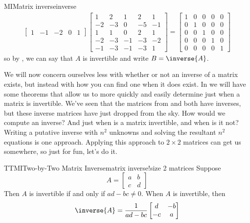 \begin{example}{MI}{Matrix inverse}{inverse}
\begin{align*}
\begin{bmatrix}
 1 & -1 & -2 & 0 & 1
\end{bmatrix}
\begin{bmatrix}
 1 & 2 & 1 & 2 & 1 \\
 -2 & -3 & 0 & -5 & -1 \\
 1 & 1 & 0 & 2 & 1 \\
 -2 & -3 & -1 & -3 & -2 \\
 -1 & -3 & -1 & -3 & 1
\end{bmatrix}
=
\begin{bmatrix}
1 & 0 & 0 & 0 & 0\\
0 & 1 & 0 & 0 & 0\\
0 & 0 & 1 & 0 & 0\\
0 & 0 & 0 & 1 & 0\\
0 & 0 & 0 & 0 & 1
\end{bmatrix}
\end{align*}
%
so by , we can say that $A$ is invertible and write $B=\inverse{A}$.
%
\end{example}
%
We will now concern ourselves less with whether or not an inverse of a matrix exists, but instead with how you can find one when it does exist.  In  we will have some theorems that allow us to more quickly and easily determine just when a matrix is invertible.
%
%
We've seen that the matrices from  and  both have inverses, but these inverse matrices have just dropped from the sky.  How would we compute an inverse?  And just when is a matrix invertible, and when is it not?  Writing a putative inverse with $n^2$ unknowns and solving the resultant $n^2$ equations is one approach.  Applying this approach to $2\times 2$ matrices can get us somewhere, so just for fun, let's do it.
%
\begin{theorem}{TTMI}{Two-by-Two Matrix Inverse}{matrix inverse!size 2 matrices}
%
Suppose 
%
\begin{equation*}
A=
\begin{bmatrix}
a&b\\
c&d
\end{bmatrix}
\end{equation*}
%
Then $A$ is invertible if and only if $ad-bc\neq 0$.  When $A$ is invertible, then
%
\begin{equation*}
\inverse{A}=\frac{1}{ad-bc}
\begin{bmatrix}
d&-b\\
-c&a
\end{bmatrix}
\end{equation*}
%
\end{theorem}
